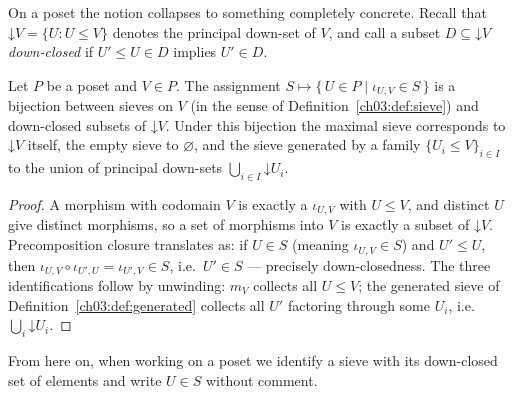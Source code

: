 On a poset the notion collapses to something completely concrete.
Recall that $\mathord{\downarrow} V = \{U : U \le V\}$ denotes the
principal down-set of $V$, and call a subset
$D \subseteq \mathord{\downarrow} V$ \emph{down-closed} if
$U' \le U \in D$ implies $U' \in D$.

\begin{proposition}\label{ch03:prop:sieve-downset}
Let $P$ be a poset and $V \in P$. The assignment
$S \mapsto \{\, U \in P \mid \iota_{U,V} \in S \,\}$ is a bijection
between sieves on $V$ (in the sense of
Definition~\ref{ch03:def:sieve}) and down-closed subsets of
$\mathord{\downarrow} V$. Under this bijection the maximal sieve
corresponds to $\mathord{\downarrow} V$ itself, the empty sieve to
$\varnothing$, and the sieve generated by a family
$\{U_i \le V\}_{i \in I}$ to the union of principal down-sets
$\bigcup_{i \in I} \mathord{\downarrow} U_i$.
\end{proposition}

\begin{proof}
A morphism with codomain $V$ is exactly a $\iota_{U,V}$ with
$U \le V$, and distinct $U$ give distinct morphisms, so a set of
morphisms into $V$ is exactly a subset of
$\mathord{\downarrow} V$. Precomposition closure translates as: if
$U \in S$ (meaning $\iota_{U,V} \in S$) and $U' \le U$, then
$\iota_{U,V} \circ \iota_{U',U} = \iota_{U',V} \in S$, i.e.\
$U' \in S$ --- precisely down-closedness. The three identifications
follow by unwinding: $m_V$ collects all $U \le V$; the generated
sieve of Definition~\ref{ch03:def:generated} collects all $U'$
factoring through some $U_i$, i.e.\
$\bigcup_i \mathord{\downarrow} U_i$.
\end{proof}

From here on, when working on a poset we identify a sieve with its
down-closed set of elements and write $U \in S$ without comment.

